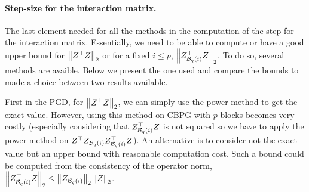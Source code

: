 \documentclass[a4]{article}
\begin{document}

\paragraph{Step-size for the interaction matrix.} The last element needed for all the methods in the computation of the step for the interaction
matrix. Essentially, we need to be able to compute or have a good upper bound for $\left \lVert Z^\top Z \right \rVert_2$ or for a fixed $i\leq p$, $\left \lVert Z_{\mathcal{B}_{q}(i)}^\top Z \right \rVert_2$.
To do so, several methods are avaible. Below we present the one used and compare the bounds to made a choice between two results available.

\medskip

First in the PGD, for $\left \lVert Z^\top Z \right \rVert_2$, we can simply use the power method \citep{golub2000eigenvalue} to get the exact value.
However, using this method on CBPG with $p$ blocks becomes very costly (especially considering that $Z_{\mathcal{B}_{q}(i)}^\top Z$ is not squared so we have to apply the power
method on $Z^\top Z_{\mathcal{B}_{q}(i)}Z_{\mathcal{B}_{q}(i)}^\top Z$). An alternative is to consider not the exact value but an upper bound with reasonable computation cost.
Such a bound could be computed from the consistency of the operator norm, \ie $\left \lVert Z_{\mathcal{B}_{q}(i)}^\top Z \right \rVert_2 \leq \left \lVert Z_{\mathcal{B}_{q}(i)} \right \rVert_2 \left \lVert Z \right \rVert_2$.
\end{document}
